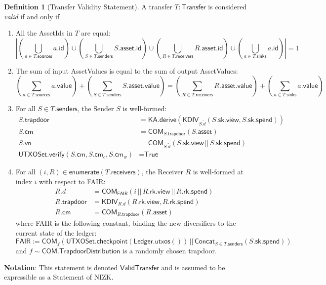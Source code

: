 \documentclass[a4paper]{article}
\theoremstyle{definition}
\newtheorem{definition}{Definition}[subsection]
\renewcommand{\abs}[1]{\left|#1\right|}
\newcommand{\AssetId}{{\textsf{AssetId}}}
\newcommand{\AssetValue}{{\textsf{AssetValue}}}
\newcommand{\COM}{{\textsf{COM}}}
\newcommand{\Concat}{{\textsf{Concat}}}
\newcommand{\Enumerate}{{\textsf{enumerate}}}
\newcommand{\FAIR}{{\textsf{FAIR}}}
\newcommand{\ID}{{\textsf{id}}}
\newcommand{\KA}{{\textsf{KA}}}
\newcommand{\KDIV}{{\textsf{KDIV}}}
\newcommand{\Ledger}{{\textsf{Ledger}}}
\newcommand{\NIZK}{{\textsf{NIZK}}}
\newcommand{\Receiver}{{\textsf{Receiver}}}
\newcommand{\Sender}{{\textsf{Sender}}}
\newcommand{\Statement}{{\textsf{Statement}}}
\newcommand{\Transfer}{{\textsf{Transfer}}}
\newcommand{\TrapdoorDistribution}{{\textsf{TrapdoorDistribution}}}
\newcommand{\True}{{\textsf{True}}}
\newcommand{\UTXOSet}{{\textsf{UTXOSet}}}
\newcommand{\VALUE}{{\textsf{value}}}
\newcommand{\ValidTransfer}{{\textsf{ValidTransfer}}}
\newcommand{\asset}{{\textsf{asset}}}
\newcommand{\checkpoint}{{\textsf{checkpoint}}}
\newcommand{\cm}{{\textsf{cm}}}
\newcommand{\derive}{{\textsf{derive}}}
\newcommand{\receivers}{{\textsf{receivers}}}
\newcommand{\rk}{{\textsf{rk}}}
\newcommand{\senders}{{\textsf{senders}}}
\newcommand{\sinks}{{\textsf{sinks}}}
\newcommand{\sk}{{\textsf{sk}}}
\newcommand{\sources}{{\textsf{sources}}}
\newcommand{\spend}{{\textsf{spend}}}
\newcommand{\trapdoor}{{\textsf{trapdoor}}}
\newcommand{\utxos}{{\textsf{utxos}}}
\newcommand{\verify}{{\textsf{verify}}}
\newcommand{\view}{{\textsf{view}}}
\newcommand{\vn}{{\textsf{vn}}}
\begin{document}
\begin{definition}[\Transfer{} Validity \Statement{}]\label{def:transfer-validity-statement}
    A transfer $T : \Transfer$ is considered \emph{valid} if and only if
    \begin{enumerate}
        \item All the \AssetId{s} in $T$ are equal:
            \[
                \abs{
                    \left(\bigcup_{a \in T.\sources} a.\ID \right)
                    \cup
                    \left(\bigcup_{S \in T.\senders} S.\asset.\ID \right)
                    \cup
                    \left(\bigcup_{R \in T.\receivers} R.\asset.\ID \right)
                    \cup
                    \left(\bigcup_{a \in T.\sinks} a.\ID \right)
                } = 1
            \]
        \item The sum of input \AssetValue{s} is equal to the sum of output \AssetValue{s}:
            \[
                \left(\sum_{a \in T.\sources} a.\VALUE\right)
                +
                \left(\sum_{S \in T.\senders} S.\asset.\VALUE\right)
                =
                \left(\sum_{R \in T.\receivers} R.\asset.\VALUE\right)
                +
                \left(\sum_{a \in T.\sinks} a.\VALUE\right)
            \]
        \item For all $S \in T.\senders$, the \Sender{} $S$ is well-formed:
            \begin{align*}
                S.\trapdoor                               &= \KA.\derive(\KDIV_{S.\tilde{d}}(S.\sk.\view, S.\sk.\spend)) \\
                S.\cm                                     &= \COM_{S.\trapdoor}(S.\asset) \\
                S.\vn                                     &= \COM_{S.\tilde{d}}(S.\sk.\view \,||\, S.\sk.\spend) \\
                \UTXOSet.\verify(S.\cm, S.\cm_c, S.\cm_w) &= \True
            \end{align*}
        \item For all $(i, R) \in \Enumerate(T.\receivers)$, the \Receiver{} $R$ is well-formed at index $i$ with respect to \FAIR{}:
            \begin{align*}
                R.d         &= \COM_{\FAIR}(i \,||\, R.\rk.\view \,||\, R.\rk.\spend) \\
                R.\trapdoor &= \KDIV_{R.d}(R.\rk.\view, R.\rk.\spend) \\
                R.\cm       &= \COM_{R.\trapdoor}(R.\asset)
            \end{align*}
            where \FAIR{} is the following constant, binding the new diversifiers to the current state of the ledger:
            \[\FAIR := \COM_f(\UTXOSet.\checkpoint(\Ledger.\utxos()) \,||\, \Concat_{S \in T.\senders}(S.\sk.\spend))\]
            and $f \sim \COM.\TrapdoorDistribution$ is a randomly chosen trapdoor.
    \end{enumerate}
    \textbf{Notation}: This statement is denoted $\ValidTransfer$ and is assumed to be expressible as a \Statement{} of \NIZK{}.
\end{definition}
\end{document}
